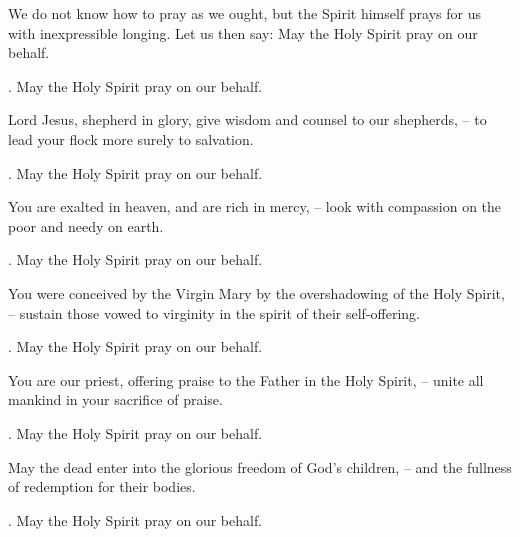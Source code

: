 \lettrine[loversize=0.15,lines=2]{W}{}e do not know how to pray as we ought, but the Spirit himself prays for us with inexpressible longing. Let us then say: May the Holy Spirit pray on our behalf.
\par \Rbar. May the Holy Spirit pray on our behalf.

Lord Jesus, shepherd in glory, give wisdom and counsel to our shepherds,
– to lead your flock more surely to salvation.
\par \Rbar. May the Holy Spirit pray on our behalf.

You are exalted in heaven, and are rich in mercy,
– look with compassion on the poor and needy on earth.
\par \Rbar. May the Holy Spirit pray on our behalf.

You were conceived by the Virgin Mary by the overshadowing of the Holy Spirit,
– sustain those vowed to virginity in the spirit of their self-offering.
\par \Rbar. May the Holy Spirit pray on our behalf.

You are our priest, offering praise to the Father in the Holy Spirit,
– unite all mankind in your sacrifice of praise.
\par \Rbar. May the Holy Spirit pray on our behalf.

May the dead enter into the glorious freedom of God’s children,
– and the fullness of redemption for their bodies.
\par \Rbar. May the Holy Spirit pray on our behalf.
